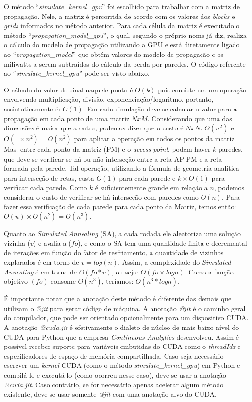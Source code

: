 \documentclass[
	12pt,				%
	twoside,			%
	a4paper,			%
	english,			%
	french,				%
	spanish,			%
	brazil				%
	]{abntex2}
\begin{document}
O método ``\emph{simulate\_kernel\_gpu}'' foi escolhido para trabalhar
com a matriz de propagação. Nele, a matriz é percorrida de acordo com os
valores dos \emph{blocks} e \emph{grids} informados no método anterior.
Para cada célula da matriz é executado o método
``\emph{propagation\_model\_gpu}'', o qual, segundo o próprio nome já
diz, realiza o cálculo do modelo de propagação utilizando a GPU e está
diretamente ligado ao ``\emph{propagation\_model}'' que obtém valores do
modelo de propagação e os miliwatts a serem subtraídos do cálculo da
perda por paredes. O código referente ao
``\emph{simulate\_kernel\_gpu}'' pode ser visto abaixo.



O cálculo do valor do sinal naquele ponto é \(O(k)\) pois consiste em um
operação envolvendo multiplicação, divisão, exponenciação/logaritmo,
portanto, assintoticamente é: \(O(1)\). Em cada simulação deve-se
calcular o valor para a propagação em cada ponto de uma matriz \(NxM\).
Considerando que uma das dimensões é maior que a outra, podemos dizer
que o custo é \(NxN\): \(O(n^{2})\) e \(O(1\times n^{2}) = O(n^{2})\)
para aplicar a operação em todos os pontos da matriz. Mas, entre cada
ponto da matriz (PM) e o \emph{access point}, podem haver \(k\) paredes,
que deve-se verificar se há ou não interseção entre a reta AP-PM e a
reta formada pela parede. Tal operação, utilizando a fórmula de
geometria analítica para interseção de retas, custa \(O(1)\) para cada
parede e \(k\times O(1)\) para verificar cada parede. Como \(k\) é
suficientemente grande em relação a \(n\), podemos considerar o custo de
verificar se há interseção com paredes como \(O(n)\). Para fazer essa
verificação de cada parede para cada ponto da Matriz, temos então:
\(O(n)\times O(n^{2}) = O(n^{3})\).

Quanto ao \emph{Simulated Annealing} (SA), a cada rodada ele aleatoriza
uma solução vizinha (\(v\)) e avalia-a (\(fo\)), e como o SA tem uma
quantidade finita e decremental de iterações em função do fator de
resfriamento, a quantidade de vizinhos explorados é em torno de
\(v = log(n)\). Assim, a complexidade do \emph{Simulated Annealing} é em
torno de \(O(fo*v)\), ou seja: \(O(fo \times log n)\). Como a função
objetivo \((fo)\) consome \(O(n^{3})\), teríamos: \(O(n^{3} * log n)\).

É importante notar que a anotação deste método é diferente das demais
que utilizam o \emph{@jit} para gerar código de máquina. A anotação
\emph{@jit} é o caminho geral do compilador, que pode ser orientado
opcionalmente para um dispositivo CUDA. A anotação \emph{@cuda.jit} é
efetivamente o dialeto de núcleo de mais baixo nível do CUDA para Python
que a empresa \emph{Continuous Analytics} desenvolveu. Assim é possível
receber suporte para variáveis embutidas do CUDA como o \emph{threadIdx}
e especificadores de espaço de memória compartilhada. Caso seja
necessário escrever um \emph{kernel} CUDA (como o método
\emph{simulate\_kernel\_gpu}) em Python e compilá-lo e executá-lo (como
ocorreu nesse caso), deve-se usar a anotação \emph{@cuda.jit}. Caso
contrário, se for necessário apenas acelerar algum método existente,
deve-se usar somente \emph{@jit} com uma anotação alvo do CUDA.
\end{document}
